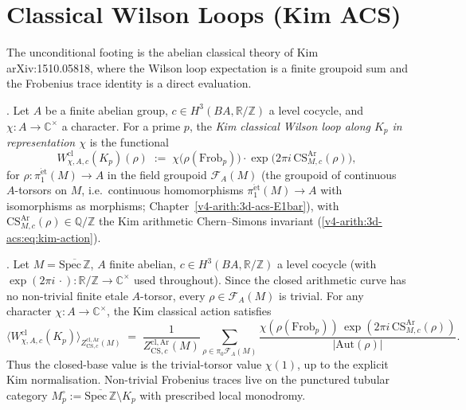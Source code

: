 \section{Classical Wilson Loops (Kim ACS)}
\label{v4-arith:w9-r1:classical}

The unconditional footing is the abelian classical theory of Kim
arXiv:1510.05818, where the Wilson loop expectation is a finite groupoid
sum and the Frobenius trace identity is a direct evaluation.

\begin{definition}
\label{v4-arith:w9-r1:def:classical-wilson}
\ClaimStatusDefinitional. Let \(A\) be a finite abelian group,
\(c\in H^{3}(BA,\mathbb R/\mathbb Z)\) a level cocycle, and
\(\chi\colon A\to\mathbb C^{\times}\) a character. For a prime \(p\), the
\emph{Kim classical Wilson loop along \(K_{p}\) in representation
\(\chi\)} is the functional
\begin{equation}
\label{v4-arith:w9-r1:eq:classical-wilson}
W^{\mathrm{cl}}_{\chi,A,c}(K_{p})(\rho)\;:=\;
\chi\bigl(\rho(\mathrm{Frob}_{p})\bigr)\cdot
\exp\!\bigl(2\pi i\,\mathrm{CS}^{\mathrm{Ar}}_{M,c}(\rho)\bigr),
\end{equation}
for \(\rho\colon\pi_{1}^{\mathrm{\acute et}}(M)\to A\) in the field
groupoid \(\mathcal F_{A}(M)\) (the groupoid of continuous \(A\)-torsors
on \(M\), i.e.\ continuous homomorphisms
\(\pi_{1}^{\mathrm{\acute et}}(M)\to A\) with isomorphisms as morphisms;
Chapter~\ref{v4-arith:3d-acs-E1bar}), with
\(\mathrm{CS}^{\mathrm{Ar}}_{M,c}(\rho)\in\mathbb Q/\mathbb Z\) the Kim
arithmetic Chern--Simons invariant (\eqref{v4-arith:3d-acs:eq:kim-action}).
\end{definition}

\begin{theorem}
\label{v4-arith:w9-r1:thm:classical-wilson-frob}
\ClaimStatusProvedHere. Let \(M=\overline{\mathrm{Spec}\,\mathbb Z}\),
\(A\) finite abelian, \(c\in H^{3}(BA,\mathbb R/\mathbb Z)\) a level cocycle
(with \(\exp(2\pi i\,\cdot)\colon\mathbb R/\mathbb Z\to\mathbb C^{\times}\)
used throughout). Since the closed arithmetic curve has no non-trivial
finite etale \(A\)-torsor, every \(\rho\in\mathcal F_{A}(M)\) is
trivial. For any character \(\chi\colon A\to\mathbb C^{\times}\), the
Kim classical action satisfies
\begin{equation}
\label{v4-arith:w9-r1:eq:classical-wilson-frob}
\langle W^{\mathrm{cl}}_{\chi,A,c}(K_{p})\rangle_{Z^{\mathrm{cl,Ar}}_{\mathrm{CS},c}(M)}
\;=\;
\frac{1}{Z^{\mathrm{cl,Ar}}_{\mathrm{CS},c}(M)}
\sum_{\rho\in\pi_{0}\mathcal F_{A}(M)}
\frac{\chi(\rho(\mathrm{Frob}_{p}))\,
\exp(2\pi i\,\mathrm{CS}^{\mathrm{Ar}}_{M,c}(\rho))}
{|\mathrm{Aut}(\rho)|}.
\end{equation}
Thus the closed-base value is the trivial-torsor value \(\chi(1)\), up
to the explicit Kim normalisation. Non-trivial Frobenius traces live on
the punctured tubular category
\(M_{p}^{\circ}:=\overline{\mathrm{Spec}\,\mathbb Z}\setminus K_{p}\)
with prescribed local monodromy.
\end{theorem}

